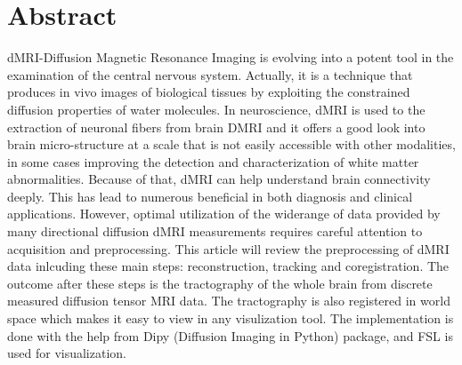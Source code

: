 
\section{Abstract}
dMRI-Diffusion Magnetic Resonance Imaging is evolving into a potent tool in the examination of the central nervous system. Actually, it is a technique that produces in vivo images of biological tissues by exploiting the constrained diffusion properties of water molecules. In neuroscience, dMRI is used to the extraction of neuronal fibers from brain DMRI and it offers a good look into brain micro-structure at a scale that is not easily accessible with other modalities, in some cases improving the detection and characterization of white matter abnormalities. Because of that, dMRI can help understand brain connectivity deeply. This has lead to numerous beneficial in both diagnosis and clinical applications. However, optimal utilization of the widerange of data provided by many directional diffusion dMRI measurements requires careful attention to acquisition and preprocessing. This article will review the preprocessing of dMRI data inlcuding these main steps: reconstruction, tracking and coregistration. The outcome after these steps is the tractography of the whole brain from discrete measured diffusion tensor MRI data. The tractography is also registered in world space which makes it easy to view in any visulization tool. The implementation is done with the help from Dipy (Diffusion Imaging in Python) package, and FSL is used for visualization.
